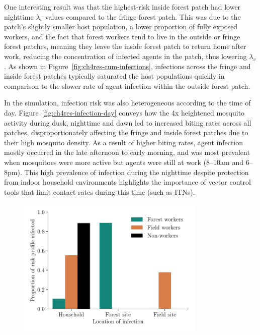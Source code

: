 One interesting result was that the highest-risk inside forest patch had lower nighttime $\lambda_v$ values compared to the fringe forest patch. This was due to the patch's slightly smaller host population, a lower proportion of fully exposed workers, and the fact that forest workers tend to live in the outside or fringe forest patches, meaning they leave the inside forest patch to return home after work, reducing the concentration of infected agents in the patch, thus lowering $\lambda_v$. As shown in Figure~\ref{fig:ch4res-cum-infections}, infections across the fringe and inside forest patches typically saturated the host populations quickly in comparison to the slower rate of agent infection within the outside forest patch.

In the simulation, infection risk was also heterogeneous according to the time of day. Figure~\ref{fig:ch4res-infection-day} conveys how the 4x heightened mosquito activity during dusk, nighttime and dawn led to increased biting rates across all patches, disproportionately affecting the fringe and inside forest patches due to their high mosquito density. As a result of higher biting rates, agent infection mostly occurred in the late afternoon to early morning, and was most prevalent when mosquitoes were more active but agents were still at work (8--10am and 6--8pm). This high prevalence of infection during the nighttime despite protection from indoor household environments highlights the importance of vector control tools that limit contact rates during this time (such as ITNs).

\begin{figure}[hbt!]
     \centering
     \includegraphics[width=0.8\textwidth]{figures/ch4/no_itn_exposure_location.pdf}
    \label{fig:ch4res-inf-locations}
\end{figure}

